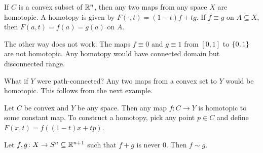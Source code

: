 \begin{examples}
    \item If $C$ is a convex subset of $\mathbb{R}^n$, then any two maps from any
        space $X$ are homotopic.
        A homotopy is given by $F(\cdot, t) = (1 - t) f + t g$.
        If $f \equiv g$ on $A \subseteq X$, then $F(a, t) = f(a) = g(a)$ on
        $A$.
    \item The other way does not work.
        The maps $f \equiv 0$ and $g \equiv 1$ from $[0, 1]$ to $\{0, 1\}$
        are not homotopic.
        Any homotopy would have connected domain but disconnected range.

        What if $Y$ were path-connected?
        Any two maps from a convex set to $Y$ would be homotopic.
        This follows from the next example.
    \item Let $C$ be convex and $Y$ be any space.
        Then any map $f\colon C \to Y$ is homotopic to some constant map.
        To construct a homotopy, pick any point $p \in C$ and define
        $F(x, t) = f((1 - t) x + t p)$.
    \item Let $f, g\colon X \to S^n \subseteq \mathbb{R}^{n+1}$ such that $f + g$
        is never $0$.
        Then $f \sim g$.
\end{examples}
